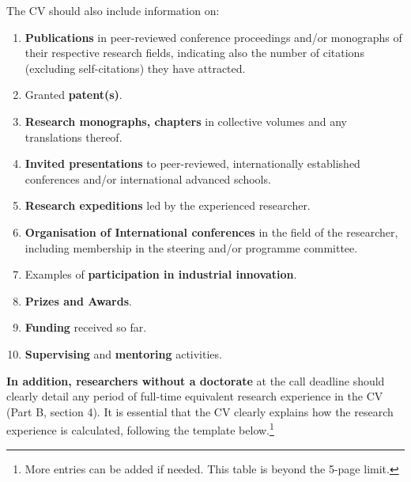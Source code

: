 The CV should also include information on:
\begin{enumerate}
  \item \textbf{Publications} in peer-reviewed conference
  proceedings and/or monographs of their respective research
  fields, indicating also the number of citations (excluding
  self-citations) they have attracted.

  \item Granted \textbf{patent(s)}.

  \item \textbf{Research monographs, chapters} in collective
  volumes and any translations thereof.

  \item \textbf{Invited presentations} to peer-reviewed,
  internationally established conferences and/or international
  advanced schools.

  \item \textbf{Research expeditions} led by the experienced
  researcher.

  \item \textbf{Organisation of International conferences} in the
  field of the researcher, including membership in the steering
  and/or programme committee.

  \item Examples of \textbf{participation in industrial innovation}.

  \item \textbf{Prizes and Awards}.

  \item \textbf{Funding} received so far.

  \item \textbf{Supervising} and \textbf{mentoring} activities.
\end{enumerate}

\textbf{In addition, researchers without a doctorate} at the call
deadline should clearly detail any period of full-time equivalent
research experience in the CV (Part B, section 4). It is essential
that the CV clearly explains how the research experience is
calculated, following the template below.\footnote{More entries
can be added if needed. This table is beyond the 5-page limit.}

